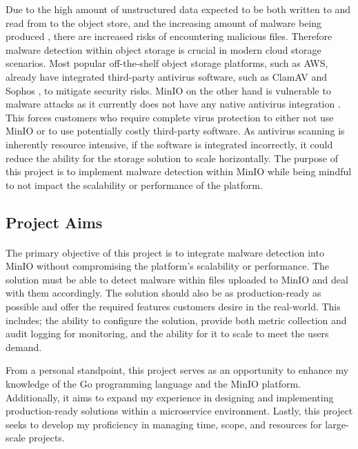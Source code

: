\documentclass[12pt, conference, final, a4paper, onecolumn, compsoc]{IEEEtran}
\begin{document}
Due to the high amount of unstructured data expected to be both written to and read
from to the object store, and the increasing amount of malware being produced
\citep{sophos}, there are increased risks of encountering malicious files.
Therefore malware detection within object storage is crucial in modern cloud
storage scenarios. Most popular off-the-shelf object storage platforms, such as
AWS, already have integrated third-party antivirus software, such as ClamAV and
Sophos \citep{amazon-md}, to mitigate security risks. MinIO on the other hand is
vulnerable to malware attacks as it currently does not have any native antivirus
integration \citep{minio}. This forces customers who require complete virus protection to
either not use MinIO or to use potentially costly third-party software. As
antivirus scanning is inherently resource intensive, if the software is
integrated incorrectly, it could reduce the ability for the storage solution to
scale horizontally. The purpose of this project is to implement malware
detection within MinIO while being mindful to not impact the scalability or
performance of the platform.

\subsection{Project Aims} %
\paragraph{}

The primary objective of this project is to integrate malware detection into
MinIO without compromising the platform's scalability or performance. The
solution must be able to detect malware within files uploaded to MinIO and deal
with them accordingly. The solution should also be as production-ready as
possible and offer the required features customers desire in the real-world.
This includes; the ability to configure the solution, provide both metric
collection and audit logging for monitoring, and the ability for it to scale to
meet the users demand.

From a personal standpoint, this project serves as an opportunity to enhance my
knowledge of the Go programming language and the MinIO platform. Additionally,
it aims to expand my experience in designing and implementing production-ready
solutions within a microservice environment. Lastly, this project seeks to
develop my proficiency in managing time, scope, and resources for large-scale
projects.
\end{document}
